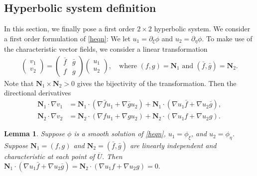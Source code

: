 \documentclass[11pt]{amsart}
\theoremstyle{plain}
\newtheorem{Lem}[Thm]{Lemma}
\theoremstyle{remark}
\numberwithin{equation}{section}
\numberwithin{Thm}{section}
\def\U{\overline{U}}
\def\N{{\mathbf N}}
\begin{document}
\subsection{Hyperbolic system definition} 
In this section, we finally pose a first order $2\times 2$ hyperbolic system. We consider a first order formulation of \eqref{heqn}: We let $u _1=\partial_\xi \phi$ and $u_2=\partial_\eta \phi$.
To make use of the characteristic vector fields, we consider a linear transformation
\begin{align} \label{formula}
 \begin{pmatrix} v_1 \\ v_2 \end{pmatrix} = \begin{pmatrix} \bar f & \bar g \\ f & g \end{pmatrix} \begin{pmatrix} u_1 \\ u_2 \end{pmatrix}, \quad \text{where $(f,g)=\N_1$ and  $(\bar f,\bar g)=\N_2$.}
\end{align}
Note that $\N_1\times\N_2>0$ gives the bijectivity of the transformation. 
Then the directional derivatives
\begin{equation} \label{pdev}
\begin{aligned}
   \N_1\cdot\nabla v_1 &= \N_1\cdot (\nabla \bar{f} u_1 + \nabla \bar{g} u_2) + \N_1 \cdot (\nabla u_1 \bar{f} + \nabla u_2 \bar{g}), \\
   \N_2\cdot\nabla v_2 &= \N_2\cdot (\nabla {f} u_1 + \nabla {g} u_2) + \N_2 \cdot (\nabla u_1 {f} + \nabla u_2 {g}).
\end{aligned}
\end{equation}
\begin{Lem} \label{lem:zero} Suppose $\phi$ is a smooth solution of \eqref{heqn}, $u_1 = \phi_\xi$, and $u_2=\phi_\eta$. Suppose $\N_1=({f},{g})$ and $\N_2=(\bar{f},\bar{g})$ are linearly independent and characteristic at each point of $\U$. Then $\N_1 \cdot (\nabla u_1 \bar{f} + \nabla u_2 \bar{g}) = \N_2 \cdot (\nabla u_1 {f} + \nabla u_2 {g})= 0.$
\end{Lem}
\end{document}
